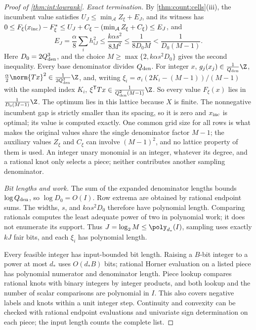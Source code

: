 \begin{proof}[Proof of \cref{thm:int:lowrank}]
\emph{Exact termination.} By \cref{thm:count:cells}(iii), the incumbent value satisfies
$U_J\le\min_{\mathcal A}Z_\xi+E_J$, and its witness has
$0\le F_\xi(x_{\rm inc})-F_\xi^*\le U_J+C_\xi-(\min_{\mathcal A}Z_\xi+C_\xi)\le E_J$, and
\begin{equation*}
 E_J=\frac\alpha8\sum_ih_{iJ}^2
 \le\frac{k\alpha s^2}{8M^2}
 \le\frac1{8D_0M}<\frac1{D_0(M-1)}.
\end{equation*}
Here $D_0=2Q_{\rm den}^3$, and the choice
$M\ge\max\{2,k\alpha s^2D_0\}$ gives the second inequality. Every base denominator divides
$Q_{\rm den}$. For integer $x$, $g_j(x_j)\in\frac1{Q_{\rm den}}\Z$,
$\frac\alpha2\norm{Tx}^2\in\frac1{2Q_{\rm den}^3}\Z$, and, writing
$\xi_i=\sigma_i(2K_i-(M-1))/(M-1)$ with the sampled index $K_i$,
$\xi^{\mathsf T}Tx\in\frac1{Q_{\rm den}^2(M-1)}\Z$. So every value $F_\xi(x)$ lies in
$\frac1{D_0(M-1)}\Z$. The optimum lies in this lattice because $X$ is finite.
The nonnegative incumbent gap is strictly smaller than its spacing, so it
is zero and $x_{\rm inc}$ is optimal; its value is
computed exactly. One common grid size for all rows is what makes the original values
share the single denominator factor $M-1$; the auxiliary values $Z_\xi$ and $C_\xi$ can
involve $(M-1)^2$, and no lattice property of them is used. An integer unary
monomial is an integer, whatever its degree, and a rational knot only
selects a piece; neither contributes another sampling denominator.

\emph{Bit lengths and work.} The sum of the expanded denominator lengths
bounds $\log Q_{\rm den}$, so $\log D_0=O(I)$. Row extrema are obtained by
rational endpoint sums. The widths, $s$, and $k\alpha s^2D_0$ therefore have
polynomial length. Comparing rationals computes the least adequate power
of two in polynomial work; it does not enumerate its support. Thus
$J=\log_2M\le\poly_{d_*}(I)$, sampling uses exactly $kJ$ fair bits, and
each $\xi_i$ has polynomial length.

Every feasible integer has input-bounded bit length. Raising a $B$-bit
integer to a power at most $d_*$ uses $O(d_*B)$ bits; rational Horner
evaluation on a listed piece has polynomial numerator and denominator
length. Piece lookup compares rational knots with binary integers by
integer products, and both lookup and the number of scalar comparisons
are polynomial in $I$. This also covers negative labels and knots within
a unit integer step. Continuity and convexity can be checked with rational
endpoint evaluations and univariate sign determination on each piece;
the input length counts the complete list.


\end{proof}
